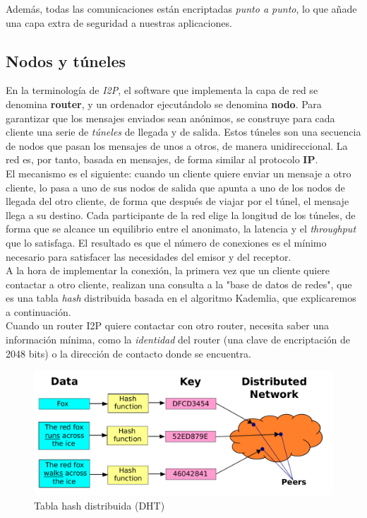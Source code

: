 Además, todas las comunicaciones están encriptadas \textit{punto a punto}, lo que añade una capa extra de seguridad a nuestras aplicaciones.

\subsection{Nodos y túneles}

En la terminología de \textit{I2P}, el software que implementa la capa de red se denomina \textbf{router}, y un ordenador ejecutándolo se denomina \textbf{nodo}. Para garantizar que los mensajes enviados sean anónimos, se construye para cada cliente una serie de \textit{túneles} de llegada y de salida. Estos túneles son una secuencia de nodos que pasan los mensajes de unos a otros, de manera unidireccional. La red es, por tanto, basada en mensajes, de forma similar al protocolo \textbf{IP}.\\

El mecanismo es el siguiente: cuando un cliente quiere enviar un mensaje a otro cliente, lo pasa a uno de sus nodos de salida que apunta a uno de los nodos de llegada del otro cliente, de forma que después de viajar por el túnel, el mensaje llega a su destino. Cada participante de la red elige la longitud de los túneles, de forma que se alcance un equilibrio entre el anonimato, la latencia y el \textit{throughput} que lo satisfaga. El resultado es que el número de conexiones es el mínimo necesario para satisfacer las necesidades del emisor y del receptor.\\


A la hora de implementar la conexión, la primera vez que un cliente quiere contactar a otro cliente, realizan una consulta a la "base de datos de redes", que es una tabla \textit{hash} distribuida basada en el algoritmo Kademlia, que explicaremos a continuación.\\

Cuando un router I2P quiere contactar con otro router, necesita saber una información mínima, como la \textit{identidad} del router (una clave de encriptación de 2048 bits) o la dirección de contacto donde se encuentra.\\

\begin{figure}
    \centering
	\includegraphics[width=.8\textwidth]{img/DHT}
	\caption{Tabla hash distribuida (DHT)}
\end{figure}


